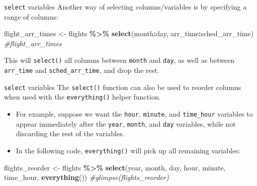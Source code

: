 \documentclass[
  ignorenonframetext,
]{beamer}
\newenvironment{Shaded}{\begin{snugshade}}{\end{snugshade}}
\newcommand{\CommentTok}[1]{\textcolor[rgb]{0.56,0.35,0.01}{\textit{#1}}}
\newcommand{\FunctionTok}[1]{\textcolor[rgb]{0.13,0.29,0.53}{\textbf{#1}}}
\newcommand{\NormalTok}[1]{#1}
\newcommand{\OtherTok}[1]{\textcolor[rgb]{0.56,0.35,0.01}{#1}}
\newcommand{\SpecialCharTok}[1]{\textcolor[rgb]{0.81,0.36,0.00}{\textbf{#1}}}
\begin{document}
\begin{frame}[fragile]{\texttt{select} variables}
\protect\hypertarget{select-variables-2}{}
Another way of selecting columns/variables is by specifying a range of
columns:

\tiny

\begin{Shaded}
\begin{Highlighting}[]
\NormalTok{flight\_arr\_times }\OtherTok{\textless{}{-}}\NormalTok{ flights }\SpecialCharTok{\%\textgreater{}\%} \FunctionTok{select}\NormalTok{(month}\SpecialCharTok{:}\NormalTok{day, arr\_time}\SpecialCharTok{:}\NormalTok{sched\_arr\_time)}
\CommentTok{\#flight\_arr\_times}
\end{Highlighting}
\end{Shaded}

\normalsize

This will \texttt{select()} all columns between \texttt{month} and
\texttt{day}, as well as between \texttt{arr\_time} and
\texttt{sched\_arr\_time}, and drop the rest.
\end{frame}

\begin{frame}[fragile]{\texttt{select} variables}
\protect\hypertarget{select-variables-3}{}
The \texttt{select()} function can also be used to reorder columns when
used with the \texttt{everything()} helper function.

\begin{itemize}
\item
  For example, suppose we want the \texttt{hour}, \texttt{minute}, and
  \texttt{time\_hour} variables to appear immediately after the
  \texttt{year}, \texttt{month}, and \texttt{day} variables, while not
  discarding the rest of the variables.
\item
  In the following code, \texttt{everything()} will pick up all
  remaining variables:
\end{itemize}

\tiny

\begin{Shaded}
\begin{Highlighting}[]
\NormalTok{flights\_reorder }\OtherTok{\textless{}{-}}\NormalTok{ flights }\SpecialCharTok{\%\textgreater{}\%} 
  \FunctionTok{select}\NormalTok{(year, month, day, hour, minute, time\_hour, }\FunctionTok{everything}\NormalTok{())}
\CommentTok{\#glimpse(flights\_reorder)}
\end{Highlighting}
\end{Shaded}

\normalsize
\end{frame}
\end{document}
